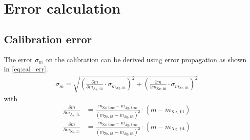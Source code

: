 \section{Error calculation}
\label{app:err}
\subsection{Calibration error}
\label{app:err_cal}
The error $\sigma_{m}$ on the calibration can be derived using error propagation as shown in \eqref{eq:cal_err}.
\begin{align}
    \sigma_m = \sqrt{ \left(\frac{\partial m}{\partial m_\text{Ag, fit}}\cdot \sigma_{m_\text{Ag, fit}}\right)^2 + \left(\frac{\partial m}{\partial m_\text{Xe, fit}}\cdot \sigma_{m_\text{Xe, fit}}\right)^2}
    \label{eq:cal_err}
\end{align}
with
\begin{align*}
     \frac{\partial m}{\partial m_\text{Ag, fit}} &= \frac{m_\text{Xe, true} - m_\text{Ag, true}}{(m_\text{Xe, fit} - m_\text{Ag, fit})^2} \cdot (m-m_\text{Xe, fit}) \\
    \frac{\partial m}{\partial m_\text{Xe, fit}} &= \frac{m_\text{Xe, true} - m_\text{Ag, true}}{(m_\text{Xe, fit} - m_\text{Ag, fit})^2} \cdot (m-m_\text{Ag, fit})
\end{align*}
